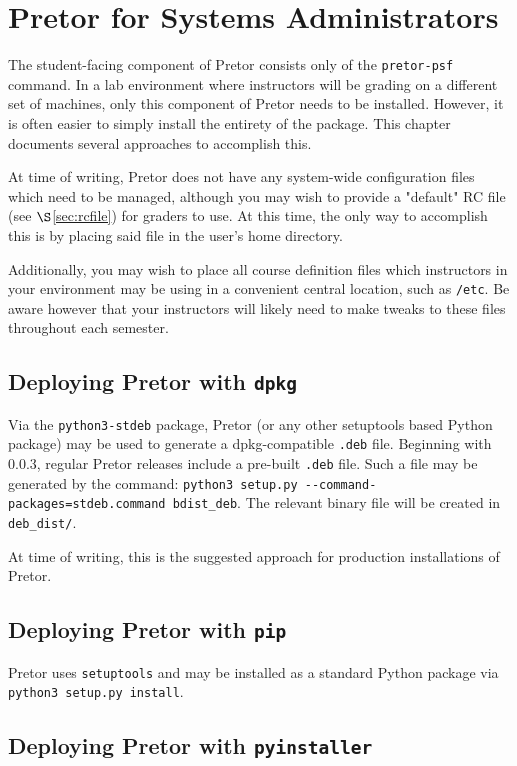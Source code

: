 \documentclass{book}
\begin{document}
\chapter{Pretor for Systems Administrators}

The student-facing component of Pretor consists only of the \texttt{pretor-psf}
command. In a lab environment where instructors will be grading on a different
set of machines, only this component of Pretor needs to be installed. However,
it is often easier to simply install the entirety of the package. This chapter
documents several approaches to accomplish this.

At time of writing, Pretor does not have any system-wide configuration files
which need to be managed, although you may wish to provide a "default"
RC file (see $\S$\ref{sec:rcfile}) for graders to use. At this time, the only
way to accomplish this is by placing said file in the user's home directory.

Additionally, you may wish to place all course definition files which
instructors in your environment may be using in a convenient central location,
such as \texttt{/etc}. Be aware however that your instructors will likely need
to make tweaks to these files throughout each semester.

\section{Deploying Pretor with \texttt{dpkg}}

Via the \texttt{python3-stdeb} package, Pretor (or any other setuptools based
Python package) may be used to generate a dpkg-compatible \texttt{.deb} file.
Beginning with 0.0.3, regular Pretor releases include a pre-built \texttt{.deb}
file. Such a file may be generated by the command: \texttt{python3 setup.py
-{}-command-packages=stdeb.command bdist\_deb}. The relevant binary file will be
created in \texttt{deb\_dist/}.

At time of writing, this is the suggested approach for production installations
of Pretor.

\section{Deploying Pretor with \texttt{pip}}

Pretor uses \texttt{setuptools} and may be installed as a standard Python
package via \texttt{python3 setup.py install}.

\section{Deploying Pretor with \texttt{pyinstaller}}
\end{document}

